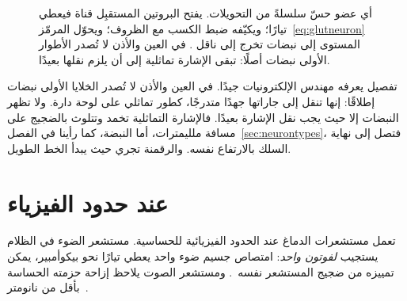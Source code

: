 \begin{figure}[t]
\centering
{}
\caption{أي عضو حسّ سلسلةً من التحويلات. يفتح البروتين المستقبِل قناة فيعطي تيارًا؛ ويكيّفه ضبط الكسب مع الظروف؛ ويحوّل المرمّز~\eqref{eq:glutneuron} المستوى إلى نبضات تخرج إلى ناقل . في العين والأذن لا تُصدر الأطوار الأولى نبضات أصلًا: تبقى الإشارة تماثلية إلى أن يلزم نقلها بعيدًا.}
\label{fig:transducer}
\end{figure}

تفصيل يعرفه مهندس الإلكترونيات جيدًا. في العين والأذن لا تُصدر الخلايا الأولى نبضات إطلاقًا: إنها تنقل إلى جاراتها جهدًا متدرجًا، كطور تماثلي على لوحة دارة. ولا تظهر النبضات إلا حيث يجب نقل الإشارة بعيدًا. فالإشارة التماثلية تخمد وتتلوث بالضجيج على مسافة ملليمترات، أما النبضة، كما رأينا في الفصل~\ref{sec:neurontypes}، فتصل إلى نهاية السلك بالارتفاع نفسه. والرقمنة تجري حيث يبدأ الخط الطويل.

\section{عند حدود الفيزياء}

تعمل مستشعرات الدماغ عند الحدود الفيزيائية للحساسية. مستشعر الضوء في الظلام يستجيب \emph{لفوتون واحد}: امتصاص جسيم ضوء واحد يعطي تيارًا نحو بيكوأمبير، يمكن تمييزه من ضجيج المستشعر نفسه~\cite{Baylor1979}. ومستشعر الصوت يلاحظ إزاحة حزمته الحساسة بأقل من نانومتر~\cite{Hudspeth1989}.

